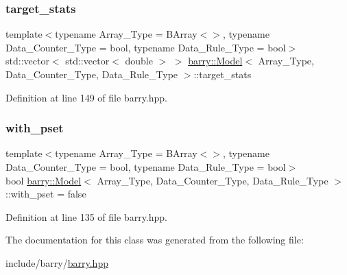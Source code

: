 \subsubsection{\texorpdfstring{target\+\_\+stats}{target\_stats}}
{\footnotesize\ttfamily template$<$typename Array\+\_\+\+Type  = B\+Array$<$$>$, typename Data\+\_\+\+Counter\+\_\+\+Type  = bool, typename Data\+\_\+\+Rule\+\_\+\+Type  = bool$>$ \\
std\+::vector$<$ std\+::vector$<$ double $>$ $>$ \hyperlink{classbarry_1_1_model}{barry\+::\+Model}$<$ Array\+\_\+\+Type, Data\+\_\+\+Counter\+\_\+\+Type, Data\+\_\+\+Rule\+\_\+\+Type $>$\+::target\+\_\+stats}



Definition at line 149 of file barry.\+hpp.

\mbox{\label{classbarry_1_1_model_a08c74ccd0aa76906f724ccb5e36d0762}} 
\subsubsection{\texorpdfstring{with\+\_\+pset}{with\_pset}}
{\footnotesize\ttfamily template$<$typename Array\+\_\+\+Type  = B\+Array$<$$>$, typename Data\+\_\+\+Counter\+\_\+\+Type  = bool, typename Data\+\_\+\+Rule\+\_\+\+Type  = bool$>$ \\
bool \hyperlink{classbarry_1_1_model}{barry\+::\+Model}$<$ Array\+\_\+\+Type, Data\+\_\+\+Counter\+\_\+\+Type, Data\+\_\+\+Rule\+\_\+\+Type $>$\+::with\+\_\+pset = false}



Definition at line 135 of file barry.\+hpp.



The documentation for this class was generated from the following file\+:\begin{DoxyCompactItemize}
\item 
include/barry/\hyperlink{barry_8hpp}{barry.\+hpp}\end{DoxyCompactItemize}
